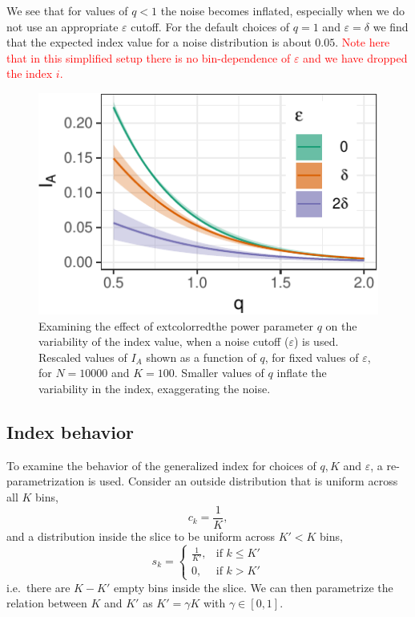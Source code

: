 \documentclass[]{interact}
\theoremstyle{plain}%
\theoremstyle{definition}
\theoremstyle{remark}
\begin{document}
We see that for values of \(q<1\) the noise becomes inflated, especially
when we do not use an appropriate \(\varepsilon\) cutoff. For the
default choices of \(q=1\) and \(\varepsilon=\delta\) we find that the
expected index value for a noise distribution is about \(0.05\).
\textcolor{red}{Note here that in this simplified setup there is no bin-dependence of $\varepsilon$ and we have dropped the index $i$.}

\begin{figure}

{\centering \includegraphics[width=0.5\linewidth]{section_pursuit_files/figure-latex/noise-1} 

}

\caption{Examining the  effect of   extcolor{red}{the power parameter} $q$ on the variability of the  index value, when a noise cutoff ($\varepsilon$) is used. Rescaled values of $I_A$ shown as a function of $q$, for fixed values of $\varepsilon$, for $N=10000$ and $K=100$. Smaller values of  $q$ inflate the variability in the index, exaggerating  the noise.}\label{fig:noise}
\end{figure}

\hypertarget{index-behavior}{%
\subsection{\texorpdfstring{Index behavior
\label{sec:behaviour}}{Index behavior }}\label{index-behavior}}

To examine the behavior of the generalized index for choices of \(q, K\)
and \(\varepsilon\), a re-parametrization is used. Consider an outside
distribution that is uniform across all \(K\) bins, \begin{equation}
c_{k} = \frac{1}{K},
\end{equation} and a distribution inside the slice to be uniform across
\(K' < K\) bins, \begin{equation}
s_{k} = \begin{cases}
    \frac{1}{K'}, & \text{if $k \leq K'$}\\
    0, & \text{if $k > K'$}
  \end{cases}
\end{equation} i.e.~there are \(K-K'\) empty bins inside the slice. We
can then parametrize the relation between \(K\) and \(K'\) as
\(K' = \gamma K\) with \(\gamma \in [0,1]\).
\end{document}
